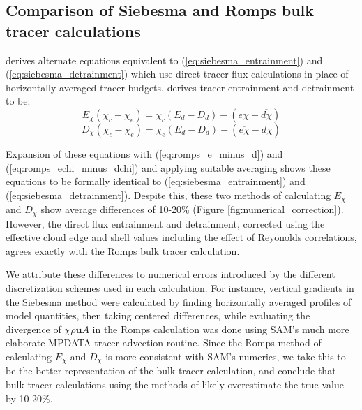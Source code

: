 \documentclass[draft,grl]{agutex}
\begin{document}
\begin{article}

\section{Comparison of Siebesma and Romps bulk tracer calculations}

\cite{Romps2010} derives alternate equations equivalent to 
(\ref{eq:siebesma_entrainment}) and (\ref{eq:siebesma_detrainment}) which use
direct tracer flux calculations in place of horizontally averaged tracer 
budgets.  \cite{Romps2010} derives tracer entrainment and detrainment to be:
\begin{equation}
  \label{eq:romps_entrainment}
  E_{\chi}(\chi_{c} - \chi_{e}) = \chi_{c}(E_d-D_d) 
                                - (\overline{e\chi} - \overline{d\chi})
\end{equation}
\begin{equation}
  \label{eq:romps_detrainment}
  D_{\chi}(\chi_{c} - \chi_{e}) = \chi_{e}(E_d-D_d) 
                                - (\overline{e\chi} - \overline{d\chi})
\end{equation}

Expansion of these equations with (\ref{eq:romps_e_minus_d}) and 
(\ref{eq:romps_echi_minus_dchi}) and applying suitable averaging shows these 
equations to be formally identical to (\ref{eq:siebesma_entrainment}) and 
(\ref{eq:siebesma_detrainment}).  Despite this, these two methods of 
calculating $E_{\chi}$ and $D_{\chi}$ show average differences of 10-20\%
(Figure \ref{fig:numerical_correction}).  However, the direct flux entrainment 
and detrainment, corrected using the effective cloud edge and shell values 
including the effect of Reyonolds correlations, agrees exactly with the Romps
bulk tracer calculation.

We attribute these differences to numerical errors introduced by the 
different discretization schemes used in each calculation.  For instance, 
vertical gradients in the Siebesma method were calculated by finding 
horizontally averaged profiles of model quantities, then taking centered 
differences, while evaluating the divergence of $\chi \rho \mathbf{u} A$ in 
the Romps calculation was done using SAM's much more elaborate MPDATA tracer 
advection routine.  Since the Romps method of calculating $E_{\chi}$ and 
$D_{\chi}$ is more consistent with SAM's numerics, we take this to be the 
better representation of the bulk tracer calculation, and conclude that 
bulk tracer calculations using the methods of \cite{Siebesma1995} likely 
overestimate the true value by 10-20\%.


\end{article}
\end{document}
